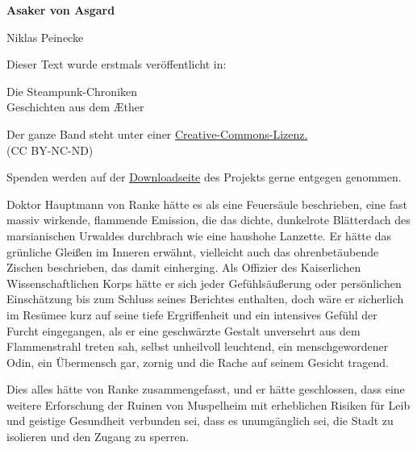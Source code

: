 \usepackage[ngerman]{babel}
\usepackage[T1]{fontenc}




\newcommand\bigpar\medskip


\raggedbottom
\begin{center}
\textbf{\huge\textsf{Asaker von Asgard}}

\medskip
Niklas Peinecke

\end{center}

\bigskip
\begin{flushleft}
Dieser Text wurde erstmals veröffentlicht in:
\begin{center}
Die Steampunk-Chroniken\\
Geschichten aus dem Æther
\end{center}

\bigskip

Der ganze Band steht unter einer
\href{http://creativecommons.org/licenses/by-nc-nd/2.0/de/}{Creative-Commons-Lizenz.} \\
(CC BY-NC-ND)

\bigskip

Spenden werden auf der
\href{http://steampunk-chroniken.de/download}{Downloadseite}
des Projekts gerne entgegen genommen.
\end{flushleft}

\newpage

Doktor Hauptmann von Ranke hätte es als eine Feuersäule
beschrieben, eine fast massiv wirkende, flammende Emission, die das
dichte, dunkelrote Blätterdach des marsianischen Urwaldes
durchbrach wie eine haushohe Lanzette. Er hätte das grünliche
Gleißen im Inneren erwähnt, vielleicht auch das ohrenbetäubende
Zischen beschrieben, das damit einherging. Als Offizier des
Kaiserlichen Wissenschaftlichen Korps hätte er sich jeder
Gefühlsäußerung oder persönlichen Einschätzung bis zum Schluss
seines Berichtes enthalten, doch wäre er sicherlich im Resümee kurz
auf seine tiefe Ergriffenheit und ein intensives Gefühl der Furcht
eingegangen, als er eine geschwärzte Gestalt unversehrt aus dem
Flammenstrahl treten sah, selbst unheilvoll leuchtend, ein
menschgewordener Odin, ein Übermensch gar, zornig und die Rache auf
seinem Gesicht tragend.

Dies alles hätte von Ranke zusammengefasst, und er hätte
geschlossen, dass eine weitere Erforschung der Ruinen von
Muspelheim mit erheblichen Risiken für Leib und geistige Gesundheit
verbunden sei, dass es unumgänglich sei, die Stadt zu isolieren und
den Zugang zu sperren.


